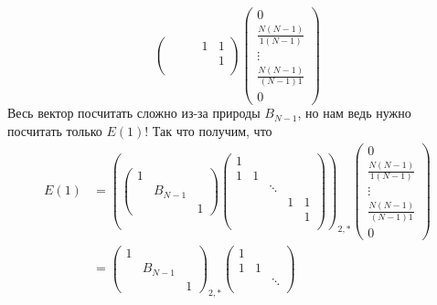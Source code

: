 \documentclass[12pt,a4paper]{article}
\begin{document}
\begin{enumproblem}
\[\begin{pmatrix}
                &&& 1& 1\\
                &&&& 1\\
            \end{pmatrix}
            \begin{pmatrix}
                0\\ \frac{N(N-1)}{1(N-1)}\\ \vdots\\ \frac{N(N-1)}{(N-1)1}\\ 0
            \end{pmatrix}
        \]
        Весь вектор посчитать сложно из-за природы $B_{N-1}$, но нам ведь нужно посчитать только $E(1)$! Так что получим, что
        \begin{align*}
            E(1)
            &=
            \left(
                \begin{pmatrix}
                    1\\
                    & B_{N-1}\\
                    &&1
                \end{pmatrix}
                \begin{pmatrix}
                    1\\
                    1& 1\\
                    && \ddots\\
                    &&& 1& 1\\
                    &&&& 1\\
                \end{pmatrix}
            \right)_{2, *}
            \begin{pmatrix}
                0\\ \frac{N(N-1)}{1(N-1)}\\ \vdots\\ \frac{N(N-1)}{(N-1)1}\\ 0
            \end{pmatrix}\\
            &=
            \begin{pmatrix}
                1\\
                & B_{N-1}\\
                &&1
            \end{pmatrix}_{2, *}
            \begin{pmatrix}
                1\\
                1& 1\\
                && \ddots\\

\end{pmatrix}
\end{align*}
\end{enumproblem}
\end{document}
